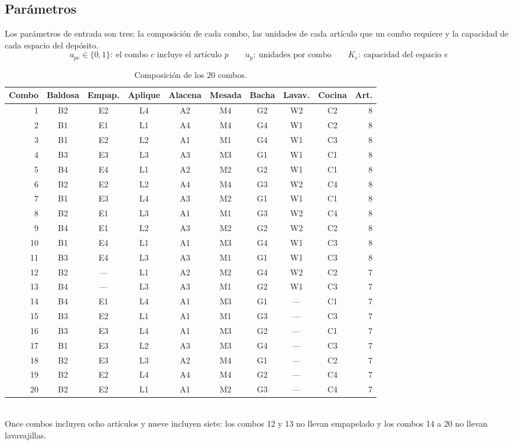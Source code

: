 \documentclass[10pt,a4paper]{article}
\begin{document}
\subsection{Parámetros}
\label{sec:parametros}

Los parámetros de entrada son tres: la composición de cada combo, las unidades
de cada artículo que un combo requiere y la capacidad de cada espacio del
depósito.
\[
a_{pc} \in \{0,1\}:\ \text{el combo } c \text{ incluye el artículo } p
\qquad
u_p:\ \text{unidades por combo}
\qquad
K_e:\ \text{capacidad del espacio } e
\]

\begin{table}[H]
\centering\small
\caption{Composición de los 20 combos.}
\label{tab:combos}
\begin{tabular}{rcccccccc r}
\toprule
\textbf{Combo} & Baldosa & Empap. & Aplique & Alacena & Mesada & Bacha & Lavav. & Cocina & \textbf{Art.} \\
\midrule
1  & B2 & E2 & L4 & A2 & M4 & G2 & W2 & C2 & 8 \\
2  & B1 & E1 & L1 & A4 & M4 & G4 & W1 & C2 & 8 \\
3  & B1 & E2 & L2 & A1 & M1 & G4 & W1 & C3 & 8 \\
4  & B3 & E3 & L3 & A3 & M3 & G1 & W1 & C1 & 8 \\
5  & B4 & E4 & L1 & A2 & M2 & G2 & W1 & C1 & 8 \\
6  & B2 & E2 & L2 & A4 & M4 & G3 & W2 & C4 & 8 \\
7  & B1 & E3 & L4 & A3 & M2 & G1 & W1 & C1 & 8 \\
8  & B2 & E1 & L3 & A1 & M1 & G3 & W2 & C4 & 8 \\
9  & B4 & E1 & L2 & A3 & M2 & G2 & W2 & C2 & 8 \\
10 & B1 & E4 & L1 & A1 & M3 & G4 & W1 & C3 & 8 \\
11 & B3 & E4 & L3 & A3 & M1 & G1 & W1 & C3 & 8 \\
12 & B2 & --- & L1 & A2 & M2 & G4 & W2 & C2 & 7 \\
13 & B4 & --- & L3 & A3 & M1 & G2 & W1 & C3 & 7 \\
14 & B4 & E1 & L4 & A1 & M3 & G1 & --- & C1 & 7 \\
15 & B3 & E2 & L1 & A1 & M1 & G3 & --- & C3 & 7 \\
16 & B3 & E3 & L4 & A1 & M3 & G2 & --- & C1 & 7 \\
17 & B1 & E3 & L2 & A3 & M3 & G4 & --- & C3 & 7 \\
18 & B2 & E3 & L3 & A2 & M4 & G1 & --- & C2 & 7 \\
19 & B2 & E2 & L4 & A4 & M4 & G2 & --- & C4 & 7 \\
20 & B2 & E2 & L1 & A1 & M2 & G3 & --- & C4 & 7 \\
\bottomrule
\end{tabular}
\vspace{1mm}\\
\footnotesize Once combos incluyen ocho artículos y nueve incluyen siete: los
combos 12 y 13 no llevan empapelado y los combos 14 a 20 no llevan lavavajillas.
\end{table}
\end{document}
